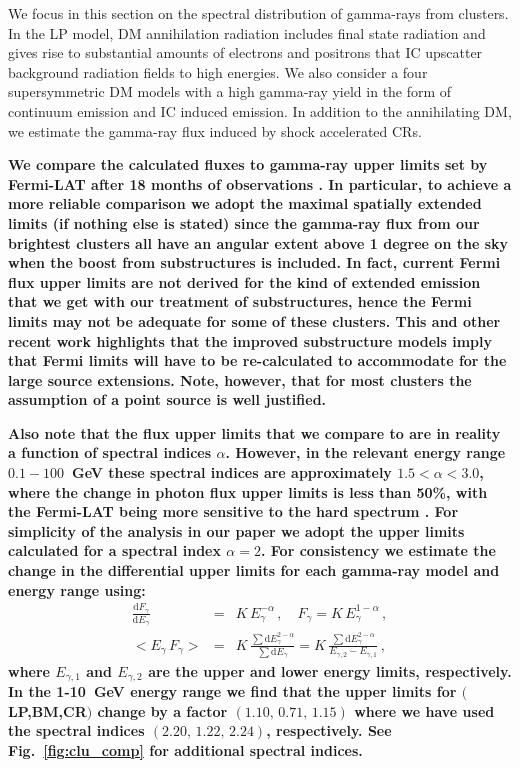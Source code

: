 \documentclass[10pt,aps,pra,reprint,amsmath,amsfonts,amssymb,showpacs,nofootinbib,floatfix]{revtex4-1}
\def\C#1{{\bf #1}}
\newcommand{\rmn}{\mathrm}
\newcommand{\dd}{\rmn{d}}
\newcommand{\eg}{E_\gamma}
\begin{document}
We focus in this section on the spectral distribution of gamma-rays
from clusters. In the LP model, DM annihilation radiation includes
final state radiation and gives rise to substantial amounts of
electrons and positrons that IC upscatter background radiation fields
to high energies. We also consider a four supersymmetric DM models with
a high gamma-ray yield in the form of continuum emission and IC
induced emission. In addition to the annihilating DM, we estimate the
gamma-ray flux induced by shock accelerated CRs.

\C{We compare the calculated fluxes to gamma-ray upper limits set by
  Fermi-LAT after 18 months of observations
  \cite{2010ApJ...717L..71A}. In particular, to achieve a more
  reliable comparison we adopt the maximal spatially extended limits
  (if nothing else is stated) since the gamma-ray flux from our
  brightest clusters all have an angular extent above 1 degree on the
  sky when the boost from substructures is included. In fact, current
  Fermi flux upper limits are not derived for the kind of extended
  emission that we get with our treatment of substructures, hence the
  Fermi limits may not be adequate for some of these clusters. This and
  other recent work highlights that the improved substructure models
  imply that Fermi limits will have to be re-calculated to accommodate
  for the large source extensions. Note, however, that for most
  clusters the assumption of a point source is well justified.}

 \C{Also note that the flux upper limits that we compare to are in
   reality a function of spectral indices $\alpha$. However, in the
   relevant energy range $0.1-100$~GeV these spectral indices are
   approximately $1.5 < \alpha < 3.0$, where the change in photon flux
   upper limits is less than 50\%, with the Fermi-LAT being more
   sensitive to the hard spectrum \cite{2010ApJ...717L..71A}. For
   simplicity of the analysis in our paper we adopt the upper limits
   calculated for a spectral index $\alpha=2$.  For consistency we
   estimate the change in the differential upper limits for each
   gamma-ray model and energy range using:
\begin{eqnarray}
\frac{\dd F_\gamma}{\dd \eg} &=& K\,\eg^{-\alpha}\,,\quad F_\gamma = 
K\,\eg^{1-\alpha}\,,\nonumber\\
<\eg \,F_\gamma> &=& K\,\frac{\sum \dd \eg^{2-\alpha}}{\sum \dd \eg}
= K\,\frac{\sum \dd \eg^{2-\alpha}}{E_{\gamma,2}-E_{\gamma,1}}\,,\nonumber
\end{eqnarray}
where $E_{\gamma,1}$ and $E_{\gamma,2}$ are the upper and lower energy
limits, respectively. In the 1-10~GeV energy range we find that the
upper limits for $($LP,BM,CR$)$ change by a factor
$(1.10,\,0.71,\,1.15)$ where we have used the spectral indices
$(2.20,\,1.22,\,2.24)$, respectively. See Fig.~\ref{fig:clu_comp} for
additional spectral indices.}
\end{document}
